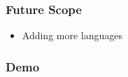 \documentclass[14pt]{beamer}
\begin{document}
\begin{frame}
    \frametitle{Future Scope}
	\noindent                                                                                                                                                                   {\color{pink} \rule{\linewidth}{0.7mm}} 
         \begin{itemize}
		\pause
	\item Adding more languages \\ 
                \pause
 \end{itemize}
\noindent{	
	   \color{pink} \rule{\linewidth}{0.7mm} }   	
\end{frame}	


\begin{frame}
	\frametitle{Demo}
\end{frame}
\end{document}

